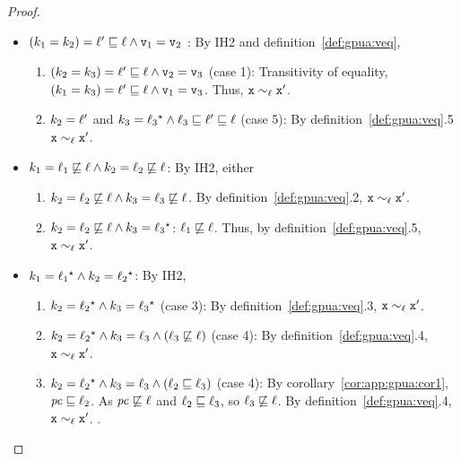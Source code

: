\begin{proof}
\begin{enumerate}
\begin{itemize}
   \item $(k_1 = k_2) = \ell' \sqsubseteq \ell \wedge \texttt{v}_1 = \texttt{v}_2$ : By IH2
     and definition~\ref{def:gpua:veq}, 
     \begin{enumerate}
       \item $(k_2 = k_3) = \ell' \sqsubseteq \ell \wedge \texttt{v}_2 = \texttt{v}_3$
         (case 1): Transitivity of equality, $(k_1 =
         k_3) = \ell' \sqsubseteq \ell \wedge \texttt{v}_1 = \texttt{v}_3$. Thus, $\texttt{x}
         \sim_\ell \texttt{x}'$.
        \item $k_2 = \ell'$ and $k_3  =   \ell_3 {}^\star   \wedge
          \ell_3 \sqsubseteq \ell' \sqsubseteq \ell$ (case 5): By definition~\ref{def:gpua:veq}.5 $\texttt{x}
          \sim_\ell \texttt{x}'$.
     \end{enumerate}

     \item $k_1 = \ell_1 \not\sqsubseteq \ell \wedge k_2 =
      \ell_2 \not\sqsubseteq \ell $: By IH2, either
      \begin{enumerate}
        \item $k_2 = \ell_2 \not\sqsubseteq \ell \wedge k_3 =
      \ell_3 \not\sqsubseteq \ell $. By definition~\ref{def:gpua:veq}.2, $\texttt{x}
         \sim_\ell \texttt{x}'$.
         \item $k_2 = \ell_2 \not\sqsubseteq \ell \wedge k_3 =
             \ell_3{}^\star  $: $\ell_1 \not\sqsubseteq
           \ell$. Thus, by definition~\ref{def:gpua:veq}.5, $\texttt{x} \sim_\ell \texttt{x}'$.
       \end{enumerate}

    \item $k_1 =   \ell_1  {}^\star   \wedge k_2 =
        \ell_2  {}^\star  $: By IH2, 
      \begin{enumerate}
       \item $k_2 =   \ell_2  {}^\star   \wedge k_3 =
        \ell_3  {}^\star  $ (case 3): By
      definition~\ref{def:gpua:veq}.3, $\texttt{x} \sim_\ell \texttt{x}'$. 
      \item $k_2 =   \ell_2  {}^\star   \wedge k_3 =
      \ell_3 \wedge (\ell_3 \not\sqsubseteq \ell)$ (case 4):
      By definition~\ref{def:gpua:veq}.4, $\texttt{x} \sim_\ell \texttt{x}'$.
      \item $k_2 =   \ell_2  {}^\star   \wedge k_3 =
      \ell_3 \wedge (\ell_2 \sqsubseteq \ell_3)$ (case 4):  
      By corollary~\ref{cor:app:gpua:cor1}, $\mathit{pc} \sqsubseteq \ell_2$. As $\mathit{pc} \not\sqsubseteq
      \ell$ and $\ell_2 \sqsubseteq \ell_3$, so $\ell_3
      \not\sqsubseteq \ell$. By definition~\ref{def:gpua:veq}.4, $\texttt{x} \sim_\ell
      \texttt{x}'$.
     .
     \end{enumerate}


\end{itemize}
\end{enumerate}
\end{proof}
